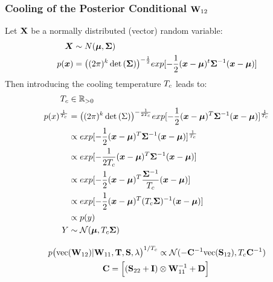 \subsubsection{Cooling of the Posterior Conditional $\Wxy$}
Let $\mathbf{X}$ be a normally distributed (vector) random variable:
\begin{align*}
\boldsymbol{X} &\sim N(\boldsymbol{\mu}, \mathbf{\Sigma})
\\
p(\boldsymbol{x}) &= \big( (2\pi)^k \det{(\mathbf{\Sigma})}\big)^{-\frac{1}{2}} exp \lbrack - \frac{1}{2} (\boldsymbol{x}-\boldsymbol{\mu})^t \mathbf{\Sigma}^{-1} (\boldsymbol{x}-\boldsymbol{\mu}) \rbrack
\end{align*}
Then introducing the cooling temperature $T_{c}$ leads to:
\begin{align*}
T_{c} &\in \mathbb{R}_{>0} 
\\
p(x)^{\frac{1}{T_{c}}}&= \big( (2\pi)^k \det{(\Sigma)}\big)^{-\frac{1}{2T_{c}}} 
exp \lbrack - \frac{1}{2} (\boldsymbol{x}-\boldsymbol{\mu})^T \mathbf{\Sigma}^{-1} (\boldsymbol{x}-\boldsymbol{\mu}) \rbrack^{\frac{1}{T_{c}}}
\\
&\propto exp \lbrack - \frac{1}{2} (\boldsymbol{x}-\boldsymbol{\mu})^T \mathbf{\Sigma}^{-1} (\boldsymbol{x}-\boldsymbol{\mu}) \rbrack^{\frac{1}{T_{c}}}
\\
&\propto exp \lbrack - \frac{1}{2T_{c}} (\boldsymbol{x}-\boldsymbol{\mu})^T \mathbf{\Sigma}^{-1} (\boldsymbol{x}-\boldsymbol{\mu}) \rbrack
\\
&\propto exp \lbrack - \frac{1}{2} (\boldsymbol{x}-\boldsymbol{\mu})^T \frac{\mathbf{\Sigma}^{-1}}{T_{c}} (\boldsymbol{x}-\boldsymbol{\mu}) \rbrack
\\
&\propto exp \lbrack - \frac{1}{2} (\boldsymbol{x}-\boldsymbol{\mu})^T (T_{c} \mathbf{\Sigma})^{-1} (\boldsymbol{x}-\boldsymbol{\mu}) \rbrack
\\
&\propto p(y) 
\\
Y &\sim \mathcal{N}(\boldsymbol{\mu}, T_{c} \mathbf{\Sigma})
\end{align*}
\begin{tcolorbox}[colback=red!5!white,colframe=red!60!black, title=Cooled Posterior Conditional of $\Wxy$]
\begin{align}
p\big(\text{vec}(\mathbf{W}_{12}) | \mathbf{W}_{11}, \mathbf{T}, \mathbf{S}, \lambda\big)^{1/T_{c}} &\propto \mathcal{N}(-\mathbf{C}^{-1} \text{vec}(\mathbf{S}_{12}), T_{c}\mathbf{C}^{-1})
\\
\mathbf{C} = \Big[
(\mathbf{S}_{22} + \mathbf{I}) &\otimes \mathbf{W}_{11}^{-1} +\mathbf{D}\Big]
\nonumber
\end{align}
\end{tcolorbox}

